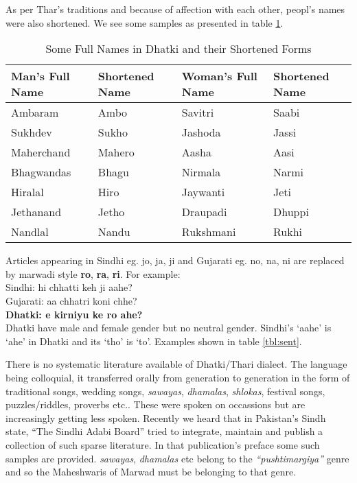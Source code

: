 As per Thar's traditions and because of affection with each other, peopl's names
were also shortened. We see some samples as presented in table \ref{tbl:names}.
\begin{table}
\begin{center}
\begin{tabular}{l|l|l|l}
\hline
\textbf{Man's Full Name}  & \textbf{Shortened Name} & \textbf{Woman's Full Name} & \textbf{Shortened Name} \\
\hline
Ambaram & Ambo & Savitri & Saabi\\
Sukhdev & Sukho & Jashoda & Jassi\\
Maherchand & Mahero & Aasha & Aasi\\
Bhagwandas & Bhagu & Nirmala & Narmi\\
Hiralal & Hiro & Jaywanti & Jeti\\
Jethanand & Jetho & Draupadi & Dhuppi\\
Nandlal & Nandu & Rukshmani & Rukhi\\
\hline
\end{tabular}
\end{center}
\caption{Some Full Names in Dhatki and their Shortened Forms}
\label{tbl:names}
\end{table}
Articles appearing in Sindhi eg. jo, ja, ji and Gujarati eg. no, na, ni are
replaced by marwadi style \textbf{ro}, \textbf{ra}, \textbf{ri}. For example:\\

Sindhi: hi chhatti keh ji aahe?\\
Gujarati: aa chhatri koni chhe?\\
\textbf{Dhatki: e kirniyu ke ro ahe?}\\

Dhatki have male and female gender but no neutral gender. Sindhi's `aahe' is
`ahe' in Dhatki and its `tho' is `to'. Examples shown in table \ref{tbl:sent}.

There is no systematic literature available of Dhatki/Thari dialect. The
language being colloquial, it transferred orally from generation to generation
in the form of traditional songs, wedding songs, \textit{sawayas},
\textit{dhamalas}, \textit{shlokas}, festival songs, puzzles/riddles, proverbs
etc.. These were spoken on occassions but are increasingly getting less spoken.
Recently we heard that in Pakistan's Sindh state, ``The Sindhi Adabi Board''
tried to integrate, maintain and publish a collection of such sparse literature.
In that publication's preface some such samples are provided. \textit{sawayas},
\textit{dhamalas} etc belong to the \textit{``pushtimargiya''} genre and so the
Maheshwaris of Marwad must be belonging to that genre.

